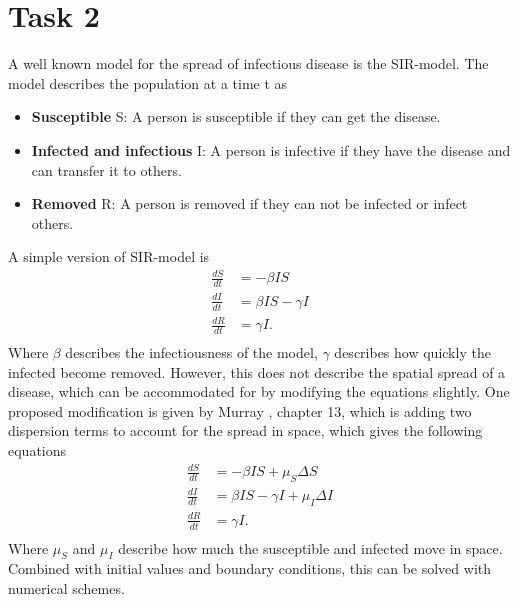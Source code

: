 \section{Task 2}

A well known model for the spread of infectious disease is the SIR-model. The model describes the population at a time t as 
\begin{itemize}
    \item \textbf{Susceptible} S: A person is susceptible if they can get the disease.
    \item \textbf{Infected and infectious} I: A person is infective if they have the disease and can transfer it to others.
    \item \textbf{Removed} R: A person is removed if they can not be infected or infect others.
\end{itemize}

A simple version of SIR-model is
\begin{equation}
    \begin{split}
        \frac{dS}{dt} &= -\beta I S \\
        \frac{dI}{dt} &= \beta IS - \gamma I \\
        \frac{dR}{dt} &= \gamma I. \\
    \end{split}
\end{equation}
Where $\beta$ describes the infectiousness of the model, $\gamma$ describes how quickly the infected become removed.
However, this does not describe the spatial spread of a disease, which can be accommodated for by modifying the equations slightly. One proposed modification is given by Murray \cite{bok}, chapter 13, which is adding
two dispersion terms to account for the spread in space, which gives the following equations
\begin{equation}
    \label{eq:super_sir}
    \begin{split}
        \frac{dS}{dt} &= -\beta I S + \mu_S \Delta S \\
        \frac{dI}{dt} &= \beta IS - \gamma I + \mu_I \Delta I\\
        \frac{dR}{dt} &= \gamma I. \\
    \end{split}
\end{equation}
Where $\mu_S$ and $\mu_I$ describe how much the susceptible and infected move in space. 
Combined with initial values and boundary conditions, this can be solved with numerical schemes.

